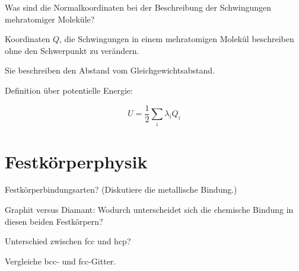 \documentclass[a5paper,12pt,ngerman,grid=front %
,print
]{kartei}
\begin{document}
	\begin{karte}{
		Was sind die Normalkoordinaten bei der Beschreibung der Schwingungen mehratomiger Moleküle?
		}
		
		Koordinaten $Q$, die Schwingungen in einem mehratomigen Molekül beschreiben ohne den Schwerpunkt zu verändern.
		
		Sie beschreiben den Abstand vom Gleichgewichtsabstand.
		
		Definition über potentielle Energie:
		
		$$  U = \frac{1}{2} \sum_i \lambda_i Q_i  $$
		
	\end{karte}




\section*{Festkörperphysik}



	\begin{karte}{
		Festkörperbindungsarten? (Diskutiere die metallische Bindung.)
		}
		
		
		
	\end{karte}


	\begin{karte}{
		Graphit versus Diamant: Wodurch unterscheidet sich die chemische Bindung in diesen
		beiden Festkörpern?
		}
		
		
		
	\end{karte}


	\begin{karte}{
		Unterschied zwischen fcc und hcp?
		}
		
		
		
	\end{karte}


	\begin{karte}{
		Vergleiche bcc- und fcc-Gitter.
		}
		
		
		
	\end{karte}
\end{document}
